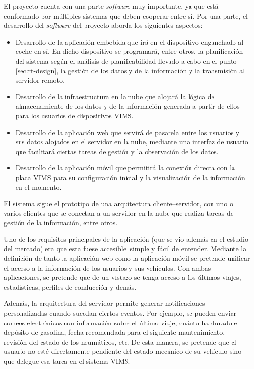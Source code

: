 El proyecto cuenta con una parte \textit{software} muy importante, ya que está
conformado por múltiples sistemas que deben cooperar entre sí. Por una parte,
el desarrollo del \textit{software} del proyecto aborda los siguientes aspectos:

\begin{itemize}
  \item Desarrollo de la aplicación embebida que irá en el dispositivo enganchado
        al coche en sí. En dicho dispositivo se programará, entre otros, la planificación
        del sistema según el análisis de planificabilidad llevado a cabo en el punto
        \ref{sec:rt-design}, la gestión de los datos y de la información y la transmisión
        al servidor remoto.
  \item Desarrollo de la infraestructura en la nube que alojará la lógica de almacenamiento de
        los datos y de la información generada a partir de ellos para los usuarios de
        dispositivos \ac{VIMS}.
  \item Desarrollo de la aplicación web que servirá de pasarela entre los usuarios
        y sus datos alojados en el servidor en la nube, mediante una interfaz de usuario
        que facilitará ciertas tareas de gestión y la observación de los datos.
  \item Desarrollo de la aplicación móvil que permitirá la conexión directa con la
        placa \ac{VIMS} para su configuración inicial y la visualización de la información
        en el momento.
\end{itemize}

El sistema sigue el prototipo de una arquitectura cliente--servidor, con uno o varios
clientes que se conectan a un servidor en la nube que realiza tareas de gestión de
la información, entre otros.

Uno de los requisitos principales de la aplicación (que se vio además en el estudio
del mercado) era que esta fuese accesible, simple y fácil de entender. Mediante la
definición de tanto la aplicación web como la aplicación móvil se pretende unificar
el acceso a la información de los usuarios y sus vehículos. Con ambas aplicaciones,
se pretende que de un vistazo se tenga acceso a los últimos viajes, estadísticas,
perfiles de conducción y demás.

Además, la arquitectura del servidor permite generar notificaciones personalizadas
cuando sucedan ciertos eventos. Por ejemplo, se pueden enviar correos electrónicos
con información sobre el último viaje, cuánto ha durado el depósito de gasolina, fecha
recomendada para el siguiente mantenimiento, revisión del estado de los neumáticos,
etc. De esta manera, se pretende que el usuario no esté directamente pendiente del
estado mecánico de su vehículo sino que delegue esa tarea en el sistema \ac{VIMS}.

